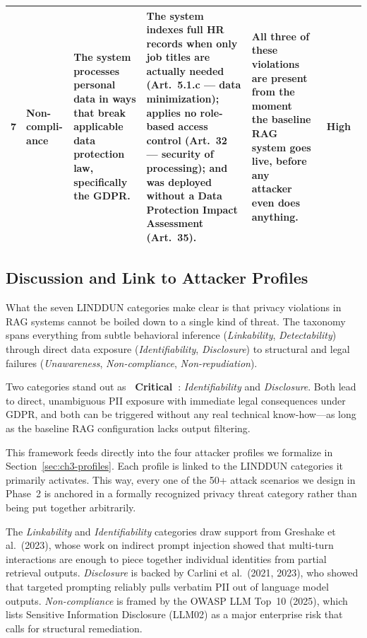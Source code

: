 \documentclass[11pt,a4paper]{report}
\newcommand{\badgecritical}{\colorbox{danger}{\color{white}\small\textbf{~Critical~}}}
\newcommand{\badgehigh}{\colorbox{warn}{\color{white}\small\textbf{~High~}}}
\begin{document}
\begin{longtable}{C{0.42cm}W{1.9cm}W{3.0cm}W{3.5cm}W{3.0cm}C{1.65cm}}
  
  \small 7 &
  \small\textbf{Non-compli-ance} &
  \small The system processes personal data in ways that break applicable
  data protection law, specifically the GDPR. &
  \small The system indexes full HR records when only job titles are actually
  needed (Art.~5.1.c --- data minimization); applies no role-based access
  control (Art.~32 --- security of processing); and was deployed without a Data
  Protection Impact Assessment (Art.~35). &
  \small All three of these violations are present from the moment
  the baseline RAG system goes live, before any attacker even does anything. &
  \badgehigh \\[4pt]

  \bottomrule
\end{longtable}

\subsection{Discussion and Link to Attacker Profiles}

What the seven LINDDUN categories make clear is that privacy violations in RAG
systems cannot be boiled down to a single kind of threat. The taxonomy spans
everything from subtle behavioral inference (\emph{Linkability},
\emph{Detectability}) through direct data exposure (\emph{Identifiability},
\emph{Disclosure}) to structural and legal failures (\emph{Unawareness},
\emph{Non-compliance}, \emph{Non-repudiation}).

Two categories stand out as \badgecritical: \emph{Identifiability} and
\emph{Disclosure}. Both lead to direct, unambiguous PII exposure with
immediate legal consequences under GDPR, and both can be triggered without
any real technical know-how---as long as the baseline RAG configuration lacks
output filtering.

This framework feeds directly into the four attacker profiles we formalize in
Section~\ref{sec:ch3-profiles}. Each profile is linked to the LINDDUN categories it primarily
activates. This way, every one of the 50+ attack scenarios we design in Phase~2
is anchored in a formally recognized privacy threat category rather than being
put together arbitrarily.

The \emph{Linkability} and \emph{Identifiability} categories draw support from
Greshake et al.\ (2023), whose work on indirect prompt injection showed
that multi-turn interactions are enough to piece together individual identities
from partial retrieval outputs. \emph{Disclosure} is backed by
Carlini et al.\ (2021, 2023), who showed that targeted prompting reliably
pulls verbatim PII out of language model outputs.
\emph{Non-compliance} is framed by the OWASP LLM Top~10 (2025), which
lists Sensitive Information Disclosure (LLM02) as a major enterprise
risk that calls for structural remediation.
\end{document}
